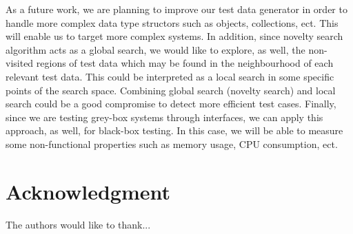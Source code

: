 \documentclass[conference]{IEEEtran}
\begin{document}
As a future work, we are planning to improve our test data generator in order to handle more complex data type structors such as objects, collections, ect. This will enable us to target more complex systems. In addition, since novelty search algorithm acts as a global search, we would like to explore, as well, the non-visited regions of test data which may be found in the neighbourhood of each relevant test data. This could be interpreted as a local search in some specific points of the search space. Combining global search (novelty search) and local search could be a good compromise to detect more efficient test cases. Finally, since we are testing grey-box systems through interfaces, we can apply this approach, as well, for black-box testing. In this case, we will be able to measure some non-functional properties such as memory usage, CPU consumption, ect.






\section*{Acknowledgment}


The authors would like to thank...







%
%
%




\end{document}
